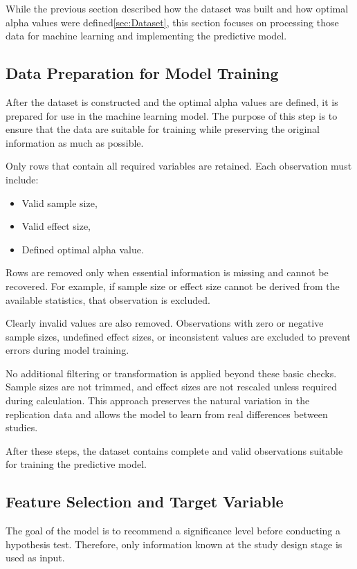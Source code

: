{While the previous section described how the dataset was built and how optimal alpha values were defined\ref{sec:Dataset}, this section focuses on processing those data for machine learning and implementing the predictive model.

\subsection{Data Preparation for Model Training}

After the dataset is constructed and the optimal alpha values are defined, it is prepared for use in the machine learning model. The purpose of this step is to ensure that the data are suitable for training while preserving the original information as much as possible.

Only rows that contain all required variables are retained. Each observation must include:

\begin{itemize}
	\item Valid sample size,
	\item  Valid effect size,
	\item  Defined optimal alpha value.
\end{itemize}

Rows are removed only when essential information is missing and cannot be recovered. For example, if sample size or effect size cannot be derived from the available statistics, that observation is excluded.

Clearly invalid values are also removed. Observations with zero or negative sample sizes, undefined effect sizes, or inconsistent values are excluded to prevent errors during model training.

No additional filtering or transformation is applied beyond these basic checks. Sample sizes are not trimmed, and effect sizes are not rescaled unless required during calculation. This approach preserves the natural variation in the replication data and allows the model to learn from real differences between studies.

After these steps, the dataset contains complete and valid observations suitable for training the predictive model.

\subsection{Feature Selection and Target Variable}

The goal of the model is to recommend a significance level before conducting a hypothesis test. Therefore, only information known at the study design stage is used as input.

}
